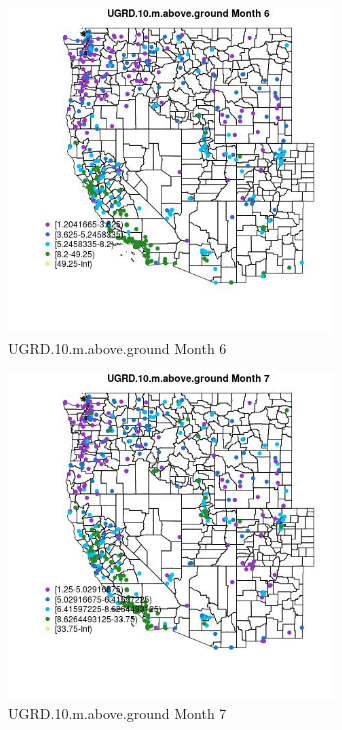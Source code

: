 \clearpage 

\begin{figure} 
\centering  
\includegraphics[width=0.77\textwidth]{Code_Outputs/ML_input_report_ML_input_PM25_Step5_part_d_de_duplicated_aves_ML_input_MapObsMo6UGRD10maboveground.jpg} 
\caption{\label{fig:ML_input_report_ML_input_PM25_Step5_part_d_de_duplicated_aves_ML_inputMapObsMo6UGRD10maboveground}UGRD.10.m.above.ground Month 6} 
\end{figure} 
 

\begin{figure} 
\centering  
\includegraphics[width=0.77\textwidth]{Code_Outputs/ML_input_report_ML_input_PM25_Step5_part_d_de_duplicated_aves_ML_input_MapObsMo7UGRD10maboveground.jpg} 
\caption{\label{fig:ML_input_report_ML_input_PM25_Step5_part_d_de_duplicated_aves_ML_inputMapObsMo7UGRD10maboveground}UGRD.10.m.above.ground Month 7} 
\end{figure} 
 

